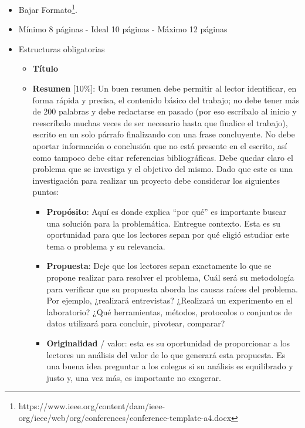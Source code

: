 \begin{itemize}
    \item Bajar Formato\footnote{https://www.ieee.org/content/dam/ieee-org/ieee/web/org/conferences/conference-template-a4.docx}. 
    
    \item Mínimo 8 páginas - Ideal 10 páginas - Máximo 12 páginas
    \item Estructuras obligatorias
    \begin{itemize}
        \item \textbf{Título}       
        \item \textbf{Resumen} [10\%]: Un buen resumen debe permitir al lector identificar, en forma rápida y precisa, el contenido básico del trabajo;  no debe tener más de 200 palabras y debe redactarse en pasado (por eso escríbalo al inicio y reescríbalo muchas veces de ser necesario hasta que finalice el trabajo),  escrito en un solo párrafo finalizando con una frase concluyente. No debe aportar información o conclusión que no está presente en el escrito, así como tampoco debe  citar referencias bibliográficas. Debe quedar claro el problema que se investiga y el objetivo del mismo. Dado que este es una investigación para realizar un proyecto debe considerar los siguientes puntos:
        \begin{itemize}
            \item \textbf{Propósito}: Aquí es donde explica ``por qué'' es importante buscar una solución para la problemática. Entregue contexto. Esta es su oportunidad para que los lectores sepan por qué eligió estudiar este tema o problema y su relevancia. 
            \item \textbf{Propuesta}:  Deje que los lectores sepan exactamente lo que se propone realizar para resolver el problema, Cuál será su metodología para verificar que su propuesta aborda las causas raíces del problema. Por ejemplo, ¿realizará entrevistas? ¿Realizará un experimento en el laboratorio? ¿Qué herramientas, métodos, protocolos o conjuntos de datos utilizará para concluir, pivotear, comparar?
            \item \textbf{Originalidad} / valor: esta es su oportunidad de proporcionar a los lectores un análisis del valor de lo que generará esta propuesta.  Es una buena idea preguntar a los colegas si su análisis es equilibrado y justo y, una vez más, es importante no exagerar. 
        \end{itemize}




\end{itemize}
\end{itemize}
